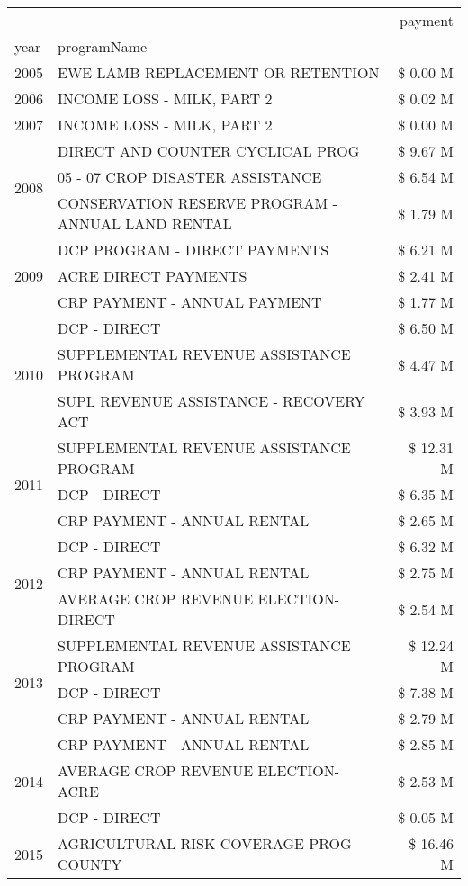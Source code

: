 \begin{tabular}{llr}
\toprule
 &  & payment \\
year & programName &  \\
\midrule
2005 & EWE LAMB REPLACEMENT OR RETENTION & \$ 0.00 M \\
\cline{1-3}
2006 & INCOME LOSS - MILK, PART 2 & \$ 0.02 M \\
\cline{1-3}
2007 & INCOME LOSS - MILK, PART 2 & \$ 0.00 M \\
\cline{1-3}
\multirow[t]{3}{*}{2008} & DIRECT AND COUNTER CYCLICAL PROG & \$ 9.67 M \\
 & 05 - 07 CROP DISASTER ASSISTANCE & \$ 6.54 M \\
 & CONSERVATION RESERVE PROGRAM - ANNUAL LAND RENTAL & \$ 1.79 M \\
\cline{1-3}
\multirow[t]{3}{*}{2009} & DCP PROGRAM - DIRECT PAYMENTS & \$ 6.21 M \\
 & ACRE DIRECT PAYMENTS & \$ 2.41 M \\
 & CRP PAYMENT - ANNUAL PAYMENT & \$ 1.77 M \\
\cline{1-3}
\multirow[t]{3}{*}{2010} & DCP - DIRECT & \$ 6.50 M \\
 & SUPPLEMENTAL REVENUE ASSISTANCE PROGRAM & \$ 4.47 M \\
 & SUPL REVENUE ASSISTANCE - RECOVERY ACT & \$ 3.93 M \\
\cline{1-3}
\multirow[t]{3}{*}{2011} & SUPPLEMENTAL REVENUE ASSISTANCE PROGRAM & \$ 12.31 M \\
 & DCP - DIRECT & \$ 6.35 M \\
 & CRP PAYMENT - ANNUAL RENTAL & \$ 2.65 M \\
\cline{1-3}
\multirow[t]{3}{*}{2012} & DCP - DIRECT & \$ 6.32 M \\
 & CRP PAYMENT - ANNUAL RENTAL & \$ 2.75 M \\
 & AVERAGE CROP REVENUE ELECTION-DIRECT & \$ 2.54 M \\
\cline{1-3}
\multirow[t]{3}{*}{2013} & SUPPLEMENTAL REVENUE ASSISTANCE PROGRAM & \$ 12.24 M \\
 & DCP - DIRECT & \$ 7.38 M \\
 & CRP PAYMENT - ANNUAL RENTAL & \$ 2.79 M \\
\cline{1-3}
\multirow[t]{3}{*}{2014} & CRP PAYMENT - ANNUAL RENTAL & \$ 2.85 M \\
 & AVERAGE CROP REVENUE ELECTION-ACRE & \$ 2.53 M \\
 & DCP - DIRECT & \$ 0.05 M \\
\cline{1-3}
\multirow[t]{3}{*}{2015} & AGRICULTURAL RISK COVERAGE PROG - COUNTY & \$ 16.46 M \\

\end{tabular}
